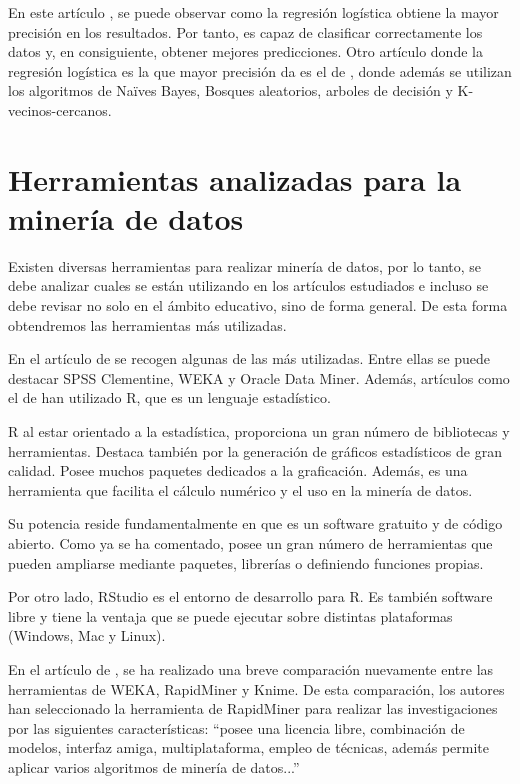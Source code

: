 En este artículo , se puede observar como la regresión logística obtiene la mayor precisión en los resultados. Por tanto, es capaz de clasificar correctamente los datos y, en consiguiente, obtener mejores predicciones. Otro artículo donde la regresión logística es la que mayor precisión da es el de , donde además se utilizan los algoritmos de Naïves Bayes, Bosques aleatorios, arboles de decisión y K-vecinos-cercanos.



\section{Herramientas analizadas para la minería de datos}
Existen diversas herramientas para realizar minería de datos, por lo tanto, se debe analizar cuales se están utilizando en los artículos estudiados e incluso se debe revisar no solo en el ámbito educativo, sino de forma general. De esta forma obtendremos las herramientas más utilizadas.

En el artículo de  se recogen algunas de las más utilizadas. Entre ellas se puede destacar SPSS Clementine, WEKA y Oracle Data Miner. Además, artículos como el de  han utilizado R, que es un lenguaje estadístico.

R al estar orientado a la estadística, proporciona un gran número de bibliotecas y herramientas. Destaca también por la generación de gráficos estadísticos de gran calidad. Posee muchos paquetes dedicados a la graficación. Además, es una herramienta que facilita el cálculo numérico y el uso en la minería de datos. \cite{emanuel2014}

Su potencia reside fundamentalmente en que es un software gratuito y de código abierto. Como ya se ha comentado, posee un gran número de herramientas que pueden ampliarse mediante paquetes, librerías o definiendo funciones propias.

Por otro lado, RStudio es el entorno de desarrollo para R. Es también software libre y tiene la ventaja que se puede ejecutar sobre distintas plataformas (Windows, Mac y Linux).

En el artículo de , se ha realizado una breve comparación nuevamente entre las herramientas de WEKA, RapidMiner y Knime. De esta comparación, los autores han seleccionado la herramienta de RapidMiner para realizar las investigaciones por las siguientes características: ``posee una licencia libre, combinación de modelos, interfaz amiga, multiplataforma, empleo de técnicas, además permite aplicar varios algoritmos de minería de datos...'' \cite{jaramillo2015aplicacion}

